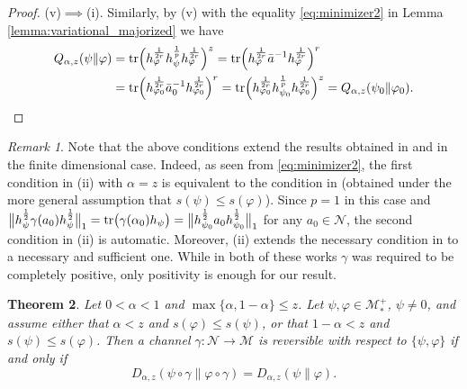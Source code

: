 \documentclass[12pt]{article}
\newtheorem{theorem}{Theorem}[section]
\theoremstyle{definition}
\theoremstyle{remark}
\newtheorem{remark}[theorem]{Remark}
\numberwithin{equation}{section}
\def\Me{\mathcal M}
\def\Ne{\mathcal N}
\def\Tr{\mathrm{tr}}
\def\ffi{\varphi}
\begin{document}
\begin{proof}
(v)$\implies$(i).\enspace
Similarly, by (v) with the equality \eqref{eq:minimizer2} in Lemma
\ref{lemma:variational_majorized} we have
\begin{align*}
Q_{\alpha,z}(\psi\|\ffi)
&=\Tr\Bigl(h_\ffi^{1\over2r}h_\psi^{1\over p}h_\ffi^{1\over2r}\Bigr)^z
=\Tr\Bigl(h_\ffi^{1\over2r}\bar a^{-1}h_\ffi^{1\over2r}\Bigr)^{r} \\
&=\Tr\Bigl(h_{\ffi_0}^{1\over2r}\bar a_0^{-1}h_{\ffi_0}^{1\over2r}\Bigr)^{r}
=\Tr\Bigl(h_{\ffi_0}^{1\over2r}h_{\psi_0}^{1\over p}h_{\ffi_0}^{1\over2r}\Bigr)^z
=Q_{\alpha,z}(\psi_0\|\ffi_0).
\end{align*}
\end{proof}


\begin{remark}\label{rem:conditions} Note that the above conditions extend the results
obtained in \cite{leditzky2017data} and \cite{zhang2020equality} in the finite dimensional case.
Indeed, as seen from \eqref{eq:minimizer2}, the first condition in (ii) with $\alpha=z$ is 
equivalent to the condition in \cite[Theorem 1]{leditzky2017data} (obtained under the more
general assumption that $s(\psi)\le s(\ffi)$). Since $p=1$ in this case and 
$\big\|h_\psi^{1\over2}\gamma(a_0)h_\psi^{1\over2}\big\|_{1}=\Tr
\bigl(\gamma(\alpha_0)h_\psi\bigr)=\big\|h_{\psi_0}^{1\over2}a_0h_{\psi_0}^{1\over2}\big\|_{1}$
for any $a_0\in \Ne$, the second condition in (ii) is automatic.
Moreover, (ii) extends the necessary condition in \cite[Theorem 1.2(2)]{zhang2020equality}
to a necessary and sufficient one. While in both {of} these works $\gamma$ was required
to be completely positive, only positivity is enough for our result. 
\end{remark}


\begin{theorem}\label{thm:suffle1} Let $0<\alpha<1$ and $\max\{\alpha,1-\alpha\}\le
z$. Let $\psi,\varphi\in \Me_*^+$, $\psi\ne0$, and assume either that $\alpha<z$ and $s(\ffi)\le
s(\psi)$, or that $1-\alpha<z$ and $s(\psi)\le s(\ffi)$. 
Then a channel $\gamma:\Ne \to \Me$ is reversible with respect to
$\{\psi,\varphi\}$ if and only if
\[
D_{\alpha,z}(\psi\circ\gamma\|\varphi\circ\gamma)=D_{\alpha,z}(\psi\|\varphi).
\]
\end{theorem}
\end{document}
